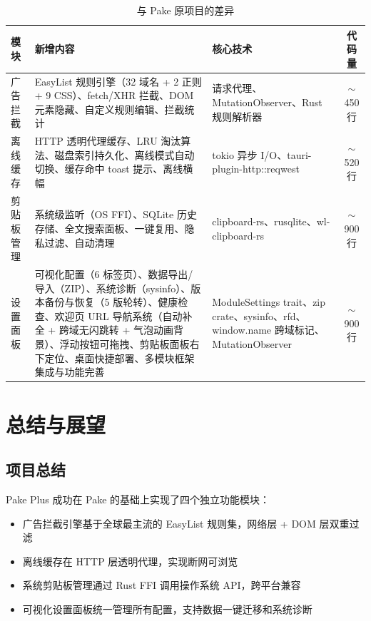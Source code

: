 \documentclass[12pt,a4paper]{ctexart}
\begin{document}
\begin{table}[H]
\centering
\small
\begin{tabularx}{\textwidth}{lXXc}
\toprule
模块 & 新增内容 & 核心技术 & 代码量 \\
\midrule
广告拦截   & EasyList 规则引擎（32 域名 + 2 正则 + 9 CSS）、fetch/XHR 拦截、DOM 元素隐藏、自定义规则编辑、拦截统计 & 请求代理、MutationObserver、Rust 规则解析器 & $\sim$450 行 \\
离线缓存   & HTTP 透明代理缓存、LRU 淘汰算法、磁盘索引持久化、离线模式自动切换、缓存命中 toast 提示、离线横幅 & tokio 异步 I/O、tauri-plugin-http::reqwest & $\sim$520 行 \\
剪贴板管理 & 系统级监听（OS FFI）、SQLite 历史存储、全文搜索面板、一键复用、隐私过滤、自动清理 & clipboard-rs、rusqlite、wl-clipboard-rs & $\sim$900 行 \\
设置面板   & 可视化配置（6 标签页）、数据导出/导入（ZIP）、系统诊断（sysinfo）、版本备份与恢复（5 版轮转）、健康检查、欢迎页 URL 导航系统（自动补全 + 跨域无闪跳转 + 气泡动画背景）、浮动按钮可拖拽、剪贴板面板右下定位、桌面快捷部署、多模块框架集成与功能完善 & ModuleSettings trait、zip crate、sysinfo、rfd、window.name 跨域标记、MutationObserver & $\sim$900 行 \\
\bottomrule
\end{tabularx}
\caption{与 Pake 原项目的差异}
\end{table}

\section{总结与展望}

\subsection{项目总结}

Pake Plus 成功在 Pake 的基础上实现了四个独立功能模块：

\begin{itemize}
  \item 广告拦截引擎基于全球最主流的 EasyList 规则集，网络层 + DOM 层双重过滤
  \item 离线缓存在 HTTP 层透明代理，实现断网可浏览
  \item 系统剪贴板管理通过 Rust FFI 调用操作系统 API，跨平台兼容
  \item 可视化设置面板统一管理所有配置，支持数据一键迁移和系统诊断
\end{itemize}
\end{document}

